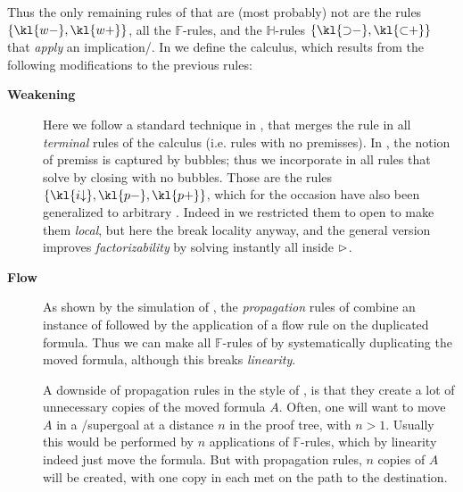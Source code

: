 Thus the only remaining rules of  that are (most probably) not
 are the  rules $\{\kl{w{-}},\kl{w{+}}\}$, all the
$\mathbb{F}$-rules, and the $\mathbb{H}$-rules $\{\kl{{\limp}{-}},
\kl{{\lsub}{+}}\}$ that \emph{apply} an implication/.
In  we define the  calculus, which results
from the following modifications to the previous rules:
\begin{description}
  \item[\textbf{Weakening}]
    Here we follow a standard technique in , that merges the
     rule in all \emph{terminal} rules of the calculus (i.e. rules with
    no premisses). In , the notion of premiss is captured by
     bubbles; thus we incorporate  in all rules that solve
     by closing  with no  bubbles. Those are the rules
    $\{\kl{i{\da}},\kl{p{-}},\kl{p{+}}\}$, which for the occasion have
    also been generalized to arbitrary . Indeed in  we
    restricted them to open  to make them \emph{local}, but here the
     break locality anyway, and the general version improves
    \emph{factorizability} by solving instantly all  inside $\mathbin{\rhd}$.

  \item[\textbf{Flow}]
    As shown by the simulation of , the
    \emph{propagation} rules of  combine an instance of
    \emph{} followed by the application of a flow rule on the
    duplicated formula. Thus we can make all $\mathbb{F}$-rules of   by systematically duplicating the moved formula, although
    this breaks \emph{linearity}.

    A downside of propagation rules in the style of , is that they
    create a lot of unnecessary copies of the moved formula $A$. Often, one will
    want to move $A$ in a /supergoal at a distance $n$ in the proof tree,
    with $n > 1$. Usually this would be performed by $n$ applications of
    $\mathbb{F}$-rules, which by linearity indeed just move the formula. But with
    propagation rules, $n$ copies of $A$ will be created, with one copy in each
     met on the path to the destination.


\end{description}
